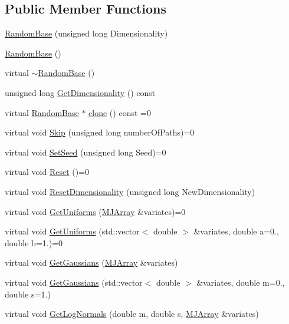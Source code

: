 \subsection*{Public Member Functions}
\begin{DoxyCompactItemize}
\item 
\hyperlink{classRandomBase_aad3e1066f029fb33bfe69cac638f54f3}{Random\+Base} (unsigned long Dimensionality)
\item 
\hyperlink{classRandomBase_a3594200fbb6d528a4a36374f2a25afee}{Random\+Base} ()
\item 
virtual \hyperlink{classRandomBase_a3a28f8ddea158351677b4d82657cf5ee}{$\sim$\+Random\+Base} ()
\item 
unsigned long \hyperlink{classRandomBase_a457727d36711c20cb23d187e59869885}{Get\+Dimensionality} () const
\item 
virtual \hyperlink{classRandomBase}{Random\+Base} $\ast$ \hyperlink{classRandomBase_a0906f4590283535ec40427ad31ba7850}{clone} () const =0
\item 
virtual void \hyperlink{classRandomBase_a0531f44e3e2a71d14ef1490aa5d90b77}{Skip} (unsigned long number\+Of\+Paths)=0
\item 
virtual void \hyperlink{classRandomBase_ae93f26c38d1675ef07cb1fd29b894b26}{Set\+Seed} (unsigned long Seed)=0
\item 
virtual void \hyperlink{classRandomBase_a6e35c1467b37fc8c5e262297223685eb}{Reset} ()=0
\item 
virtual void \hyperlink{classRandomBase_a8931e429ae130ea44af5469dc6ae728f}{Reset\+Dimensionality} (unsigned long New\+Dimensionality)
\item 
virtual void \hyperlink{classRandomBase_aa061fb77f53969f6fbe40c7454c69eb9}{Get\+Uniforms} (\hyperlink{classMJArray}{M\+J\+Array} \&variates)=0
\item 
virtual void \hyperlink{classRandomBase_a3bbf85695dbb1a9462a2b6c3f10af969}{Get\+Uniforms} (std\+::vector$<$ double $>$ \&variates, double a=0., double b=1.)=0
\item 
virtual void \hyperlink{classRandomBase_aac297a1b64959492831f5e9a1f28c03d}{Get\+Gaussians} (\hyperlink{classMJArray}{M\+J\+Array} \&variates)
\item 
virtual void \hyperlink{classRandomBase_a8428b19f897b202363c12df1471a8d52}{Get\+Gaussians} (std\+::vector$<$ double $>$ \&variates, double m=0., double s=1.)
\item 
virtual void \hyperlink{classRandomBase_a734f1712b1179fb31380e04da4a27f20}{Get\+Log\+Normals} (double m, double s, \hyperlink{classMJArray}{M\+J\+Array} \&variates)

\end{DoxyCompactItemize}
